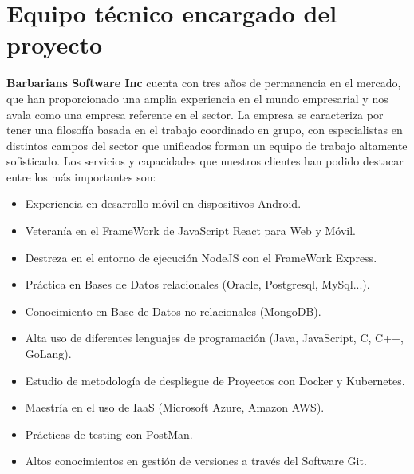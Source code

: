 \documentclass{article}
\begin{document}
\section{Equipo técnico encargado del proyecto}

\textbf{Barbarians Software Inc} cuenta con tres años de permanencia en el mercado, que han proporcionado una amplia experiencia en el mundo empresarial y nos avala como una empresa referente en el sector. La empresa se caracteriza por tener una filosofía basada en el trabajo coordinado en grupo, con especialistas en distintos campos del sector que unificados forman un equipo de trabajo altamente sofisticado.
Los servicios y capacidades que nuestros clientes han podido destacar entre los más importantes son:
\begin{itemize}
   \item Experiencia en desarrollo móvil en dispositivos Android.
   \item Veteranía en el FrameWork de JavaScript React para Web y Móvil.
   \item Destreza en el entorno de ejecución NodeJS con el FrameWork Express.
   \item Práctica en Bases de Datos relacionales (Oracle, Postgresql, MySql...).
   \item Conocimiento en Base de Datos no relacionales (MongoDB).
   \item Alta uso de diferentes lenguajes de programación (Java, JavaScript, C, C++, GoLang).
   \item Estudio de metodología de despliegue de Proyectos con Docker y Kubernetes.
   \item Maestría en el uso de IaaS (Microsoft Azure, Amazon AWS).
   \item Prácticas de testing con PostMan.
   \item Altos conocimientos en gestión de versiones a través del Software Git.
\end{itemize}
\end{document}
